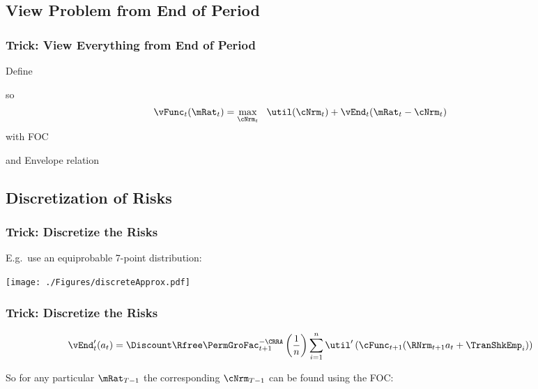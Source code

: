 \documentclass{beamer}
\begin{document}
\subsection{View Problem from End of Period}

\begin{frame}[label=Normalize]
\frametitle{Trick: View Everything from End of Period}

Define 

so 
\begin{equation}\begin{gathered}\begin{aligned}
  \vFunc_{t}(\mRat_{t})  & = \max_{\cNrm_{t}}~~ \util(\cNrm_{t}) + \vEnd_{t}(\mRat_{t}-\cNrm_{t})
\end{aligned}\end{gathered}\end{equation}
with FOC

and Envelope relation


\end{frame}


\subsection{Discretization of Risks}
\begin{frame}[label=DiscretizeFig]
\frametitle{Trick: Discretize the Risks}

E.g.\ use an equiprobable 7-point distribution:\medskip\medskip

\texttt{[image: ./Figures/discreteApprox.pdf]}

\end{frame}

\begin{frame}[label=DiscretizeEqn]
\frametitle{Trick: Discretize the Risks}

\begin{equation}\begin{gathered}\begin{aligned}
        \vEnd_{t}^{\prime}({a}_{t})  & =  \Discount \Rfree \PermGroFac_{t+1}^{-\CRRA} \left(\frac{1}{n}\right) \sum_{i=1}^{n} \util^{\prime}\left(\cFunc_{t+1}(\RNrm_{t+1} {a}_{t} + \TranShkEmp_{i})\right)
\end{aligned}\end{gathered}\end{equation}

%

\pause 
So for any particular $\mRat_{T-1}$ the corresponding $\cNrm_{T-1}$ can be found
using the FOC:



\end{frame}
\end{document}
